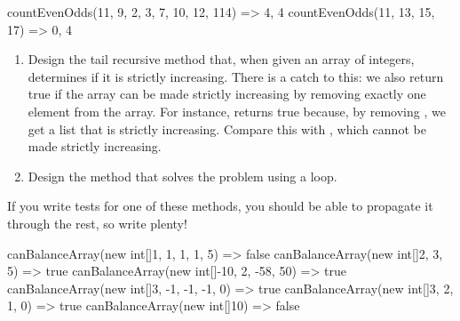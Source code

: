 \begin{verbnobox}[\small]
countEvenOdds({11, 9, 2, 3, 7, 10, 12, 114}) => {4, 4}
countEvenOdds({11, 13, 15, 17})              => {0, 4}
\end{verbnobox}

\begin{enumerate}[label=(\alph*)]
    \item Design the  tail recursive method that, when given an array of integers, determines if it is strictly increasing. There is a catch to this: we also return true if the array can be made strictly increasing by removing exactly one element from the array. For instance,  returns true because, by removing , we get a list that is strictly increasing. Compare this with , which cannot be made strictly increasing.
    \item Design the  method that solves the problem using a loop.
\end{enumerate}
If you write tests for one of these methods, you should be able to propagate it through the rest, so write plenty!




\begin{verbnobox}[\small]
canBalanceArray(new int[]{1, 1, 1, 1, 5})    => false
canBalanceArray(new int[]{2, 3, 5})          => true
canBalanceArray(new int[]{-10, 2, -58, 50})  => true
canBalanceArray(new int[]{3, -1, -1, -1, 0}) => true
canBalanceArray(new int[]{3, 2, 1, 0})       => true
canBalanceArray(new int[]{10})               => false
\end{verbnobox}

